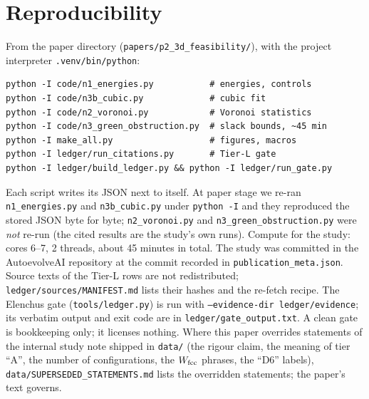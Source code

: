 \documentclass[10pt]{article}
\theoremstyle{remark}
\begin{document}
\section{Reproducibility}
From the paper directory (\texttt{papers/p2\_3d\_feasibility/}), with the project interpreter \texttt{.venv/bin/python}:
\begin{verbatim}
python -I code/n1_energies.py           # energies, controls
python -I code/n3b_cubic.py             # cubic fit
python -I code/n2_voronoi.py            # Voronoi statistics
python -I code/n3_green_obstruction.py  # slack bounds, ~45 min
python -I make_all.py                   # figures, macros
python -I ledger/run_citations.py       # Tier-L gate
python -I ledger/build_ledger.py && python -I ledger/run_gate.py
\end{verbatim}
Each script writes its JSON next to itself. At paper stage we re-ran \texttt{n1\_energies.py} and \texttt{n3b\_cubic.py} under \texttt{python -I} and they reproduced the stored JSON byte for byte; \texttt{n2\_voronoi.py} and \texttt{n3\_green\_obstruction.py} were \emph{not} re-run (the cited results are the study's own runs). Compute for the study: cores 6--7, 2 threads, about 45 minutes in total. The study was committed in the AutoevolveAI repository at the commit recorded in
\texttt{publication\_meta.json}. Source texts of the Tier-L rows are not redistributed; \texttt{ledger/sources/MANIFEST.md} lists their hashes and the re-fetch recipe.
The Elenchus gate (\texttt{tools/ledger.py}) is run with \texttt{--evidence-dir ledger/evidence}; its verbatim output and exit code are in \texttt{ledger/gate\_output.txt}. A clean gate is bookkeeping only; it licenses nothing.
Where this paper overrides statements of the internal study note shipped in \texttt{data/} (the rigour claim, the meaning of tier ``A'', the number of configurations, the $W_{\rm fcc}$ phrases, the ``D6'' labels), \texttt{data/SUPERSEDED\_STATEMENTS.md} lists the overridden statements; the paper's text governs.
\end{document}
